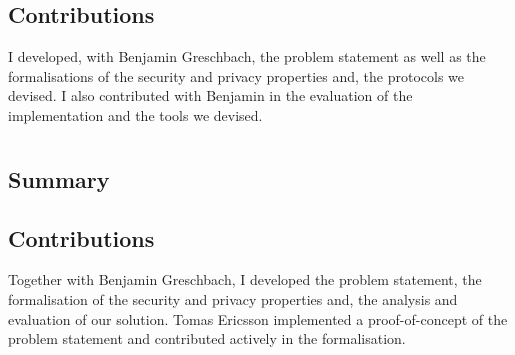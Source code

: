 \documentclass[showtrims, oldfontcommands]{kthesis}
\begin{document}
\subsection{Contributions}
I developed, with Benjamin Greschbach, the problem statement as well as the formalisations 
of the security and privacy properties and, the protocols we devised. I also contributed 
with Benjamin in the evaluation of the implementation and the tools we devised.

\section{}
\begingroup\centering
\begin{ppBox}
\end{ppBox}
\endgroup

\subsection{Summary}


\subsection{Contributions}
Together with Benjamin Greschbach, I developed the problem statement, the formalisation 
of the security and privacy properties and, the analysis and evaluation of our solution. 
Tomas Ericsson implemented a proof-of-concept of the problem statement and contributed 
actively in the formalisation.

\end{document}
